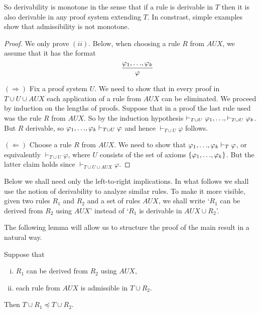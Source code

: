 \documentclass[manuscript, screen, review]{acmart}
\newcommand{\AUX}{\mathit{AUX}}
\begin{document}
So derivability is monotone in the sense that if a rule is derivable
in $T$ then it is also derivable in any proof system extending $T$. In
constrast, simple examples show that admissibility is not monotone.

\begin{proof}
  We only prove $(ii)$.
Below, when choosing a rule $R$ from $\AUX$, we assume that it has the format
\[ 
 \qquad \frac{\varphi_1,\mbox{$\ldots$},\varphi_k}{\varphi}
\]

\III

\NI
$(\Rightarrow)$ Fix a proof system $U$.  We need to show that in every
proof in $T \cup U \cup \AUX$ each application of a rule from $\AUX$
can be eliminated.  We proceed by induction on the lengths of
proofs. Suppose that in a proof the last rule used was the rule $R$ from $\AUX$.
So by the induction hypothesis
$ \vdash_{T \cup U} \varphi_1, \mbox{$\ldots$}, \vdash_{T \cup U} \varphi_k$.  But $R$
derivable, so 
$\varphi_1, \mbox{$\ldots$}, \varphi_k \vdash_{T \cup U} \varphi$ and hence
$\vdash_{T \cup U} \varphi$ follows.

\III

\NI
$(\Leftarrow)$ Choose a rule $R$ from $\AUX$.
We need to show that
$\varphi_1, \mbox{$\ldots$}, \varphi_k \vdash_T \varphi$, or equivalently
$\vdash_{T \cup U} \varphi$, where $U$ consists of the set of axioms
$\mbox{$\{{\varphi_1,\mbox{$\ldots$},\varphi_k}\}$}$.  But the latter claim holds since
$\vdash_{T \cup U \cup \AUX} \varphi$.
\end{proof}

Below we shall need only the left-to-right implications.  In what
follows we shall use the notion of derivability to analyze similar
rules. To make it more visible, given two rules $R_1$ and $R_2$ and a
set of rules $\AUX$, we shall write `$R_1$ can be derived from $R_2$
using $\AUX$' instead of `$R_1$ is derivable in $\AUX \cup R_2$'.

The following lemma will allow us to structure the proof of the main result
in a natural way.

\begin{lemma} \label{lem:equ}
  Suppose that
  \begin{enumerate}[(i)]
  \item $R_1$ can be derived from $R_2$ using $\AUX$,
    
  \item each rule from $\AUX$ is admissible in $T \cup R_2$.    
  \end{enumerate}

  Then $T \cup R_1 \preceq T \cup R_2$.
\end{lemma}
\end{document}
